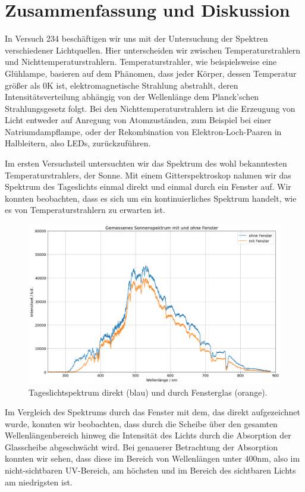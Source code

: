 \section{Zusammenfassung und Diskussion}

In Versuch 234 beschäftigen wir uns mit der Untersuchung der Spektren verschiedener Lichtquellen. Hier unterscheiden wir zwischen Temperaturstrahlern und Nichttemperaturstrahlern. Temperaturstrahler, wie beispielsweise eine Glühlampe, basieren auf dem Phänomen, dass jeder Körper, dessen Temperatur größer als $0\si{\kelvin}$ ist, elektromagnetische Strahlung abstrahlt, deren Intensitätsverteilung abhängig von der Wellenlänge dem Planck'schen Strahlungsgesetz folgt. Bei den Nichttemperaturstrahlern ist die Erzeugung von Licht entweder auf Anregung von Atomzuständen, zum Beispiel bei einer Natriumdampflampe, oder der Rekombination von Elektron-Loch-Paaren in Halbleitern, also LEDs, zurückzuführen.

Im ersten Versuchsteil untersuchten wir das Spektrum des wohl bekanntesten Temperaturstrahlers, der Sonne. Mit einem Gitterspektroskop nahmen wir das Spektrum des Tageslichts einmal direkt und einmal durch ein Fenster auf. Wir konnten beobachten, dass es sich um ein kontinuierliches Spektrum handelt, wie es von Temperaturstrahlern zu erwarten ist. 

\begin{figure}[H]
  \centering
  \includegraphics[width=.9\textwidth]{files/plots/himmel_m_o_g.png}
  \caption{Tageslichtspektrum direkt (blau) und durch Fensterglas (orange).}
  \label{fig:himmel_m_o_g_zsmf}
\end{figure}


Im Vergleich des Spektrums durch das Fenster mit dem, das direkt aufgezeichnet wurde, konnten wir beobachten, dass durch die Scheibe über den gesamten Wellenlängenbereich hinweg die Intensität des Lichts durch die Absorption der Glasscheibe abgeschwächt wird. Bei genauerer Betrachtung der Absorption konnten wir sehen, dass diese im Bereich von Wellenlängen unter $400\si{\nano\meter}$, also im nicht-sichtbaren UV-Bereich, am höchsten und im Bereich des sichtbaren Lichts am niedrigsten ist.

